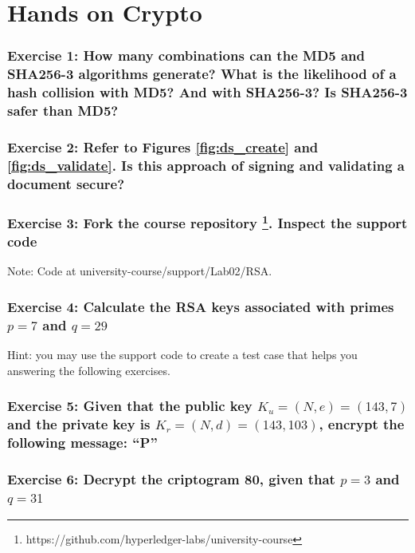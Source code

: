 \documentclass[12pt,a4paper]{article}
\theoremstyle{definition}
\begin{document}
\section{Hands on Crypto}

\subsubsection*{Exercise 1: How many combinations can the MD5 and SHA256-3 algorithms generate? What is the likelihood of a hash collision with MD5? And with SHA256-3? Is SHA256-3 safer than MD5?}


\subsubsection*{Exercise 2: Refer to Figures \ref{fig:ds_create} and \ref{fig:ds_validate}. Is this approach of signing and validating a document secure?}

\subsubsection*{Exercise 3: Fork the course repository \footnote{https://github.com/hyperledger-labs/university-course}. Inspect the support code}

Note: Code at university-course/support/Lab02/RSA.

\subsubsection*{Exercise 4: Calculate the RSA keys associated with primes $p = 7$ and $q = 29$}

Hint: you may use the support code to create a test case that helps you answering the following exercises.

\subsubsection*{Exercise 5: Given that the public key $K_u = (N,e) = (143, 7)$ and the private key is $K_r = (N,d) = (143, 103)$, encrypt the following message: ``P''}


\subsubsection*{Exercise 6: Decrypt the criptogram 80, given that $p = 3$ and $q = 31$ }







\end{document}
